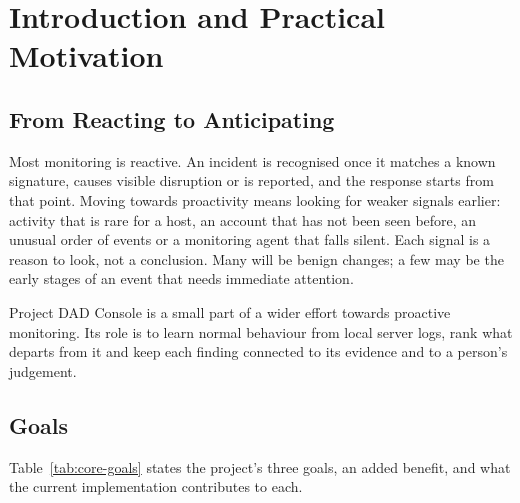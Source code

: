 \documentclass[11pt,a4paper]{article}
\begin{document}
\clearpage
\tableofcontents
\clearpage
{}

\section{Introduction and Practical Motivation}

\subsection{From Reacting to Anticipating}

Most monitoring is reactive. An incident is recognised once it matches a known signature, causes visible disruption or is reported, and the response starts from that point. Moving towards proactivity means looking for weaker signals earlier: activity that is rare for a host, an account that has not been seen before, an unusual order of events or a monitoring agent that falls silent. Each signal is a reason to look, not a conclusion. Many will be benign changes; a few may be the early stages of an event that needs immediate attention.

Project DAD Console is a small part of a wider effort towards proactive monitoring. Its role is to learn normal behaviour from local server logs, rank what departs from it and keep each finding connected to its evidence and to a person's judgement.

\subsection{Goals}

Table~\ref{tab:core-goals} states the project's three goals, an added benefit, and what the current implementation contributes to each.
\end{document}
